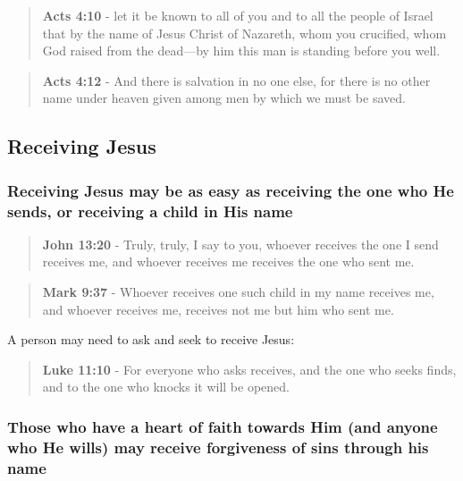\documentclass[11pt]{article}
\begin{document}
\begin{quote}
\textbf{Acts 4:10} - let it be known to all of you and to all the people of Israel that by the name of Jesus Christ of Nazareth, whom you crucified, whom God raised from the dead—by him this man is standing before you well.
\end{quote}

\begin{quote}
\textbf{Acts 4:12} - And there is salvation in no one else, for there is no other name under heaven given among men by which we must be saved.
\end{quote}

\subsection{Receiving Jesus}
\label{sec:orge4358b0}

\subsubsection{Receiving Jesus may be as easy as receiving the one who He sends, or receiving a child in His name}
\label{sec:orgcbf670a}

\begin{quote}
\textbf{John 13:20} - Truly, truly, I say to you, whoever receives the one I send receives me, and whoever receives me receives the one who sent me.
\end{quote}

\begin{quote}
\textbf{Mark 9:37} - Whoever receives one such child in my name receives me, and whoever receives me, receives not me but him who sent me.
\end{quote}

A person may need to ask and seek to receive Jesus:

\begin{quote}
\textbf{Luke 11:10} - For everyone who asks receives, and the one who seeks finds, and to the one who knocks it will be opened.
\end{quote}

\subsubsection{Those who have a heart of faith towards Him (and anyone who He wills) may receive forgiveness of sins through his name}
\label{sec:org48c2f87}
\end{document}
